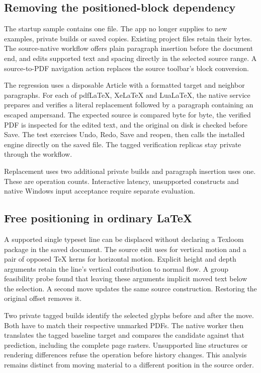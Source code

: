 \subsection{Removing the positioned-block dependency}
The startup sample contains one  file. The app no longer supplies
 to new examples, private builds or saved copies. Existing
project files retain their bytes. The source-native workflow offers plain
paragraph insertion before the document end, and edits supported text and
spacing directly in the selected source range. A source-to-PDF navigation
action replaces the source toolbar's block conversion.

The regression uses a disposable Article with a formatted target and
neighbor paragraphs. For each of pdf\LaTeX{}, Xe\LaTeX{} and Lua\LaTeX{},
the native service prepares and verifies a literal replacement followed by
a paragraph containing an escaped ampersand. The expected source is compared
byte for byte, the verified PDF is inspected for the edited text, and the
original on disk is checked before Save. The test exercises Undo, Redo,
Save and reopen, then calls the installed engine directly on the saved file.
The tagged verification replicas stay private through the workflow.

Replacement uses two additional private builds and paragraph insertion uses
one. These are operation counts. Interactive latency, unsupported constructs
and native Windows input acceptance require separate evaluation.

\subsection{Free positioning in ordinary LaTeX}
A supported single typeset line can be displaced without declaring a
Texloom package in the saved document. The source edit uses
 for vertical motion and a pair of opposed
\TeX{} kerns for horizontal motion. Explicit height and depth arguments retain the
line's vertical contribution to normal flow. A group feasibility probe found
that leaving these arguments implicit moved text below the selection. A second move updates the same
source construction. Restoring the original offset removes it.

Two private tagged builds identify the selected glyphs before and after the
move. Both have to match their respective unmarked PDFs. The native worker
then translates the tagged baseline target and compares the candidate
against that prediction, including the complete page rasters. Unsupported
line structures or rendering differences refuse the operation before
history changes. This analysis remains distinct from moving material to a
different position in the source order.

